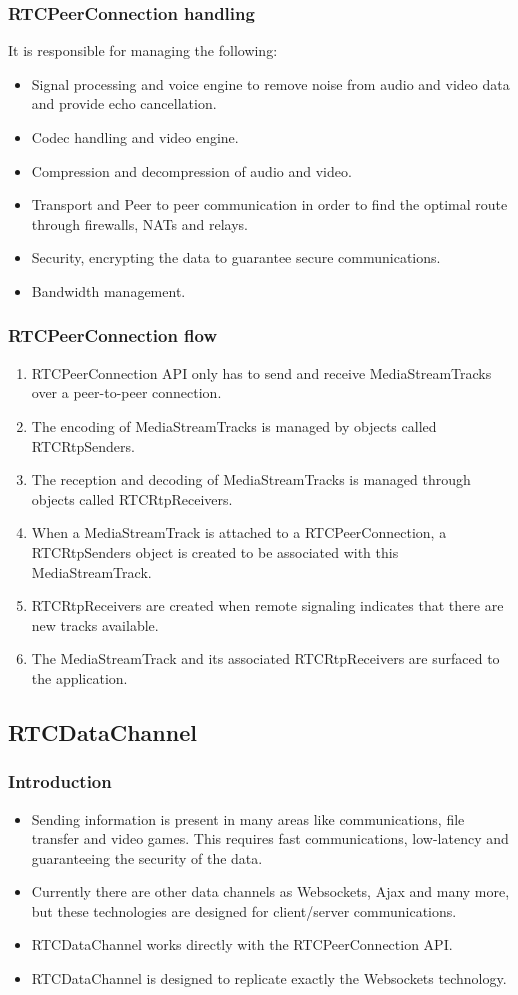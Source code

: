 \begin{frame}[fragile]\frametitle{RTCPeerConnection handling}
It is responsible for managing the following:	
\begin{itemize}
\item Signal processing and voice engine to remove noise from audio and video data 
and provide echo cancellation.
\item Codec handling and video engine.
\item Compression and decompression of audio and video.
\item Transport and Peer to peer communication in order to find the optimal route through firewalls, 
NATs and relays.
\item Security, encrypting the data to guarantee secure communications.
\item Bandwidth management. 
\end{itemize}
\end{frame}


\begin{frame}[fragile]\frametitle{RTCPeerConnection flow}
\begin{enumerate}
\item RTCPeerConnection API only has to send and receive MediaStreamTracks over a peer-to-peer connection.
\item The encoding of MediaStreamTracks is managed by objects called RTCRtpSenders.
\item The reception and decoding of MediaStreamTracks is managed through objects called RTCRtpReceivers.
\item When a MediaStreamTrack is attached to a RTCPeerConnection, 
a RTCRtpSenders object is created to be associated with this MediaStreamTrack.
\item RTCRtpReceivers  are created when remote signaling indicates 
that there are new tracks available.
\item The MediaStreamTrack and its associated RTCRtpReceivers are surfaced 
to the application.
\end{enumerate}
\end{frame}

\subsection{RTCDataChannel}

\begin{frame}[fragile]\frametitle{Introduction}
\begin{itemize}
\item Sending information is present in many areas like communications, file transfer and video games.
This requires fast communications, low-latency and guaranteeing the security of the data.
\item Currently there are other data channels as Websockets, Ajax and many more, but these technologies are designed for client/server
communications.
\item RTCDataChannel works directly with the RTCPeerConnection API.
\item RTCDataChannel is designed to replicate exactly the Websockets technology.
\end{itemize}
\end{frame}

